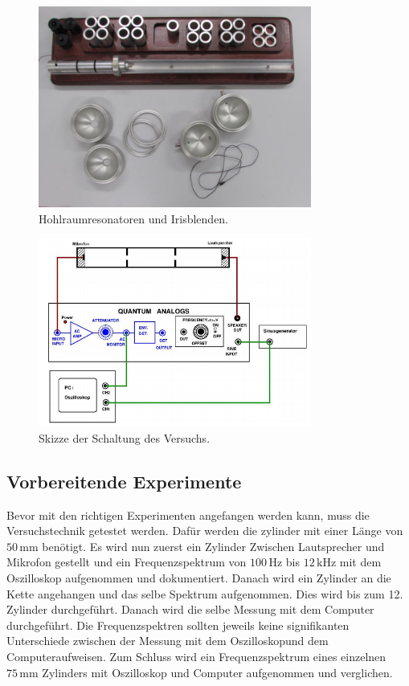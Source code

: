 \begin{figure}[H]
    \centering
    \includegraphics[width=0.8\textwidth]{build/Experiment.PNG}
    \caption{Hohlraumresonatoren und Irisblenden. \cite{Anleitung}}
    \label{fig:material}
\end{figure}

\begin{figure}[H]
    \centering
    \includegraphics[width=0.8\textwidth]{build/Schaltung.PNG}
    \caption{Skizze der Schaltung des Versuchs. \cite{Anleitung}}
    \label{fig:schaltung}
\end{figure}

\subsection{Vorbereitende Experimente}
\label{sec:vorbereitung}

Bevor mit den richtigen Experimenten angefangen werden kann, muss die Versuchstechnik getestet werden. Dafür werden die zylinder mit einer Länge von $50 \, \mathrm{mm}$ benötigt. Es wird nun zuerst ein Zylinder Zwischen Lautsprecher und Mikrofon gestellt und ein Frequenzspektrum von $100 \, \mathrm{Hz}$ bis $12 \, \mathrm{kHz}$ mit dem Oszilloskop aufgenommen und dokumentiert. Danach wird ein Zylinder an die Kette angehangen und das selbe Spektrum aufgenommen. Dies wird bis zum 12. Zylinder durchgeführt. Danach wird die selbe Messung mit dem Computer durchgeführt. Die Frequenzspektren sollten jeweils keine signifikanten Unterschiede zwischen der Messung mit dem Oszilloskopund dem Computeraufweisen. Zum Schluss wird ein Frequenzspektrum eines einzelnen $75 \, \mathrm{mm}$ Zylinders mit Oszilloskop und Computer aufgenommen und verglichen.

